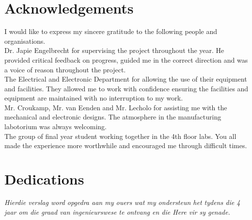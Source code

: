 \begin{abstract}[english]%
In this report a design method for the swinging and balancing  of the underactuated robotic gymnast was researched, simulated and tested on a physical model. The electronic, mechanical and software designs are discussed to show how the physical model was constructed, controllers implemented and data acquired.
\end{abstract}


\begin{abstract}[afrikaans]%
In die projek word die swaaiende en balanseering beheerwette vir 'n robotiese gimnas genavors, ontwerp en getoets op 'n fisiese model. Die eletroniese, meganiese en sagteware ontwerpe word bespreek om ten einde te wys hoe die fisiese model, beheerders en so voort geimplementeer en getoets is.
\end{abstract}


\chapter{Acknowledgements}%

I would like to express my sincere gratitude to the following people
and organisations.\\

Dr. Japie Engelbrecht for supervising the project throughout the year. He provided critical feedback on progress, guided me in the correct direction and was a voice of reason throughout the project.\\

The Electrical and Electronic Department for allowing the use of their equipment and facilities. They allowed me to work with confidence ensuring the facilities and equipment are maintained with no interruption to my work.\\

Mr$.$ Croukamp, Mr$.$ van Eenden and Mr$.$ Lecholo for assisting me with the mechanical and electronic designs. The atmosphere in the manufacturing labotorium was always welcoming.\\

The group of final year student working together in the 4th floor labs. You all made the experience more worthwhile and encouraged me through  difficult times. 




\chapter{Dedications}%
 \vfill
 \begin{Afr}
 \begin{center}\itshape
    Hierdie verslag word opgedra aan my ouers wat my ondersteun het tydens die 4 jaar om die graad van ingenieurswese te ontvang en die Here vir sy genade. 
 \end{center}
 \end{Afr}
 \vfill
 \clearpage

\endinput
